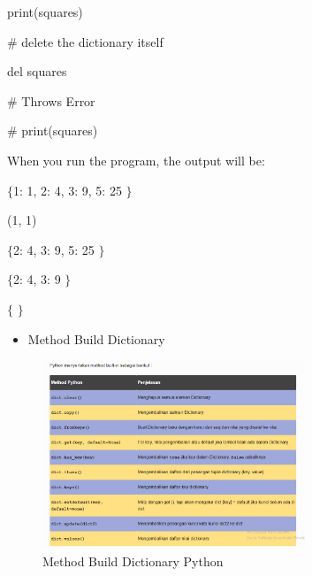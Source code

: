\noindent 
 \hspace*{0.5in} print(squares) \par
\vspace{12pt}
\noindent 
 \hspace*{0.5in}  $  \#  $ delete the dictionary itself \par
\noindent 
 \hspace*{0.5in} del squares \par
\vspace{12pt}
\noindent 
 \hspace*{0.5in}  $  \#  $ Throws Error \par
\noindent 
 \hspace*{0.5in}  $  \#  $ print(squares) \par
\noindent 
When you run the program, the output will be: \par
{} \par
\noindent 
 $  \{  $1: 1, 2: 4, 3: 9, 5: 25 $  \}  $ \par
\noindent 
(1, 1) \par
\noindent 
 $  \{  $2: 4, 3: 9, 5: 25 $  \}  $ \par
\noindent 
 $  \{  $2: 4, 3: 9 $  \}  $ \par
\noindent 
 $  \{  $ $  \}  $ \par
\vspace{12pt}
\vspace{12pt}
\vspace{12pt}
\vspace{12pt}
\noindent 

\begin{itemize}
	\item Method Build Dictionary
\end{itemize}

\begin{figure}[ht]
	\centerline{\includegraphics[width=0.70\textwidth]{figures/Method}}
	\caption{Method Build Dictionary Python}
	\label{Method Build Dictionary Python}
\end{figure}

